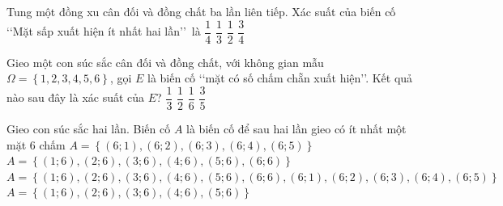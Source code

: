 \begin{ex}%
	Tung một đồng xu cân đối và đồng chất ba lần liên tiếp. Xác suất của  biến cố \lq \lq Mặt sấp xuất hiện ít nhất hai lần\rq \rq \ là
	 \choice
		 {$\dfrac{1}{4}$}
		{$\dfrac{1}{3}$} 
		 {\True $\dfrac{1}{2}$}
		 {$\dfrac{3}{4}$}
\end{ex}

\begin{ex}%
	Gieo một con súc sắc cân đối và đồng chất,  với không gian mẫu $\Omega =\left\{1,2,3,4,5,6 \right\}$, gọi $E$ là biến cố \lq\lq mặt có số chấm chẵn xuất hiện\rq\rq. Kết quả nào sau đây là xác suất của $E$?
	 \choice
		 {$\dfrac{1}{3}$}
		 {\True $\dfrac{1}{2}$}
		 {$\dfrac{1}{6}$}
		{$\dfrac{3}{5}$} 
\end{ex}

\begin{ex}%
	Gieo con súc sắc hai lần.  Biến cố $A$ là biến cố để sau hai lần gieo có ít nhất một mặt $6$ chấm
	\choice 
		{$A=\left\{\left(6;1\right),\left(6;2\right),\left(6;3\right),\left(6;4\right),\left(6;5\right)\right\}$} 
		 {$A=\left\{\left(1;6\right),\left(2;6\right),\left(3;6\right),\left(4;6\right),\left(5;6\right),\left(6;6\right)\right\}$}
		{\True $A=\left\{\left(1;6\right),\left(2;6\right),\left(3;6\right),\left(4;6\right),\left(5;6\right),\left(6;6\right),\left(6;1\right),\left(6;2\right),\left(6;3\right),\left(6;4\right),\left(6;5\right)\right\}$} 
		{$A=\left\{\left(1;6\right),\left(2;6\right),\left(3;6\right),\left(4;6\right),\left(5;6\right)\right\}$} 
\end{ex}

